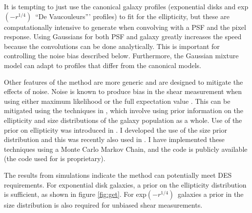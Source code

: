 \documentclass[12pt]{article}
\newcommand{\devauc}{De Vaucouleurs'}
\newcommand{\devprof}{exp$(-r^{1/4})$}
\begin{document}
It is tempting to just use the canonical galaxy profiles (exponential disks and
\devprof\ ``\devauc'' profiles) to fit for the ellipticity, but these are
computationally intensive to generate when convolving with a PSF and the pixel
response.  Using Gaussians for both PSF and galaxy greatly increases the speed
because the convolutions can be done analytically.  This is important for
controlling the noise bias described below.  Furthermore, the Gaussian mixture
model can adapt to profiles that differ from the canonical models.

Other features of the method are more generic and are designed to mitigate the
effects of noise.  Noise is known to produce bias in the shear measurement when
using either maximum likelihood \cite{Refreg12} or the full expectation value
\cite{Miller12}.  This can be mitigated using the techniques in
\cite{Miller07,Miller12}, which involve using prior information on the
ellipticity and size distributions of the galaxy population as a whole.  Use of
the prior on ellipticity was introduced in \cite{Miller07}. I developed the use
of the size prior distribution and this was recently also used in
\cite{Miller12}.  I have implemented these techniques using a Monte Carlo
Markov Chain, and the code is publicly available (the code used for
\cite{Miller07} is proprietary).


The results from simulations indicate the method can potentially meet DES
requirements.  For exponential disk galaxies, a prior on the ellipticity
distribution is sufficient, as shown in figure \ref{fig:get}.  For \devprof\
galaxies a prior in the size distribution is also required for unbiased shear
measurements.
\end{document}
